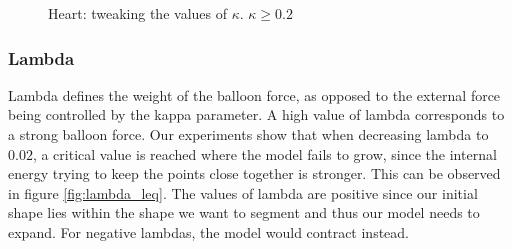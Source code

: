 \begin{figure}[!hbt]
\centering   
{}
\caption{Heart: tweaking the values of $ \kappa $. $\kappa \geq 0.2$}
\label{fig:kappa_geq}
\end{figure}

\subsubsection{Lambda}

Lambda defines the weight of the balloon force, as opposed to the external force being controlled by the kappa parameter. A high value of lambda corresponds to a strong balloon force. Our experiments show that when decreasing lambda to $0.02$, a critical value is reached where the model fails to grow, since the internal energy trying to keep the points close together is stronger. This can be observed in figure \ref{fig:lambda_leq}. The values of lambda are positive since our initial shape lies within the shape we want to segment and thus our model needs to expand. For negative lambdas, the model would contract instead.

